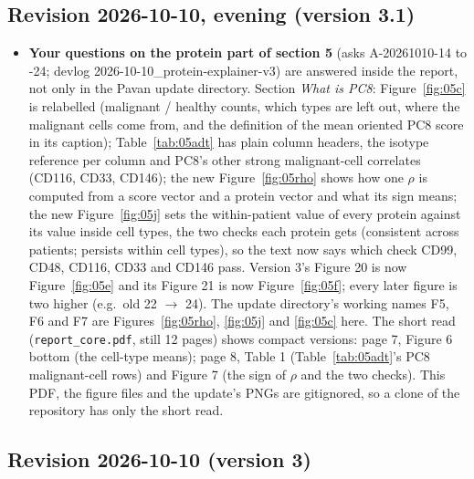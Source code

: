 \documentclass[11pt]{article}
\begin{document}
\subsection*{Revision 2026-10-10, evening (version 3.1)}

\begin{itemize}[leftmargin=1.4em]
\item \textbf{Your questions on the protein part of section 5} (asks A-20261010-14 to -24; devlog 2026-10-10\_protein-explainer-v3) are answered inside the report, not only in the Pavan update directory. Section \emph{What is PC8}: Figure~\ref{fig:05c} is relabelled (malignant / healthy counts, which types are left out, where the malignant cells come from, and the definition of the mean oriented PC8 score in its caption); Table~\ref{tab:05adt} has plain column headers, the isotype reference per column and PC8's other strong malignant-cell correlates (CD116, CD33, CD146); the new Figure~\ref{fig:05rho} shows how one $\rho$ is computed from a score vector and a protein vector and what its sign means; the new Figure~\ref{fig:05j} sets the within-patient value of every protein against its value inside cell types, the two checks each protein gets (consistent across patients; persists within cell types), so the text now says which check CD99, CD48, CD116, CD33 and CD146 pass. Version 3's Figure 20 is now Figure~\ref{fig:05e} and its Figure 21 is now Figure~\ref{fig:05f}; every later figure is two higher (e.g.\ old 22 $\to$ 24). The update directory's working names F5, F6 and F7 are Figures~\ref{fig:05rho}, \ref{fig:05j} and \ref{fig:05c} here. The short read (\texttt{report\_core.pdf}, still 12 pages) shows compact versions: page 7, Figure 6 bottom (the cell-type means); page 8, Table 1 (Table~\ref{tab:05adt}'s PC8 malignant-cell rows) and Figure 7 (the sign of $\rho$ and the two checks). This PDF, the figure files and the update's PNGs are gitignored, so a clone of the repository has only the short read.
\end{itemize}

\subsection*{Revision 2026-10-10 (version 3)}
\end{document}
